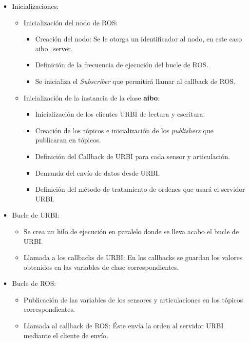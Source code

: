 \documentclass[12pt,a4paper,final,twoside]{book}
\begin{document}
\begin{itemize}
\item Inicializaciones: 
\begin{itemize}
\item Inicialización del nodo de ROS:
\begin{itemize}
\item Creación del nodo: Se le otorga un identificador al nodo, en este caso aibo{\_}server.
\item Definición de la frecuencia de ejecución del bucle de ROS.
\item Se inicializa el \textit{Subscriber} que permitirá llamar al callback de ROS.   
\end{itemize}

\item Inicialización de la instancia de la clase \textbf{aibo}:
\begin{itemize}
\item Inicialización de los clientes URBI de lectura y escritura.
\item Creación de los tópicos e inicialización de los \textit{publishers} que publicaran en tópicos.
\item Definición del Callback de URBI para cada sensor y articulación.
\item Demanda del envío de datos desde URBI.
\item Definición del método de tratamiento de ordenes que usará el servidor URBI.
\end{itemize}
\end{itemize}
\item Bucle de URBI:
\begin{itemize}
\item Se crea un hilo de ejecución en paralelo donde se lleva acabo el bucle de URBI.
\item Llamada a los callbacks de URBI: En los callbacks se guardan los valores obtenidos en las variables de clase correspondientes.

\end{itemize}
\item Bucle de ROS:
\begin{itemize}
\item Publicación de las variables de los sensores y articulaciones en los tópicos correspondientes.
\item Llamada al callback de ROS: Éste envía la orden al servidor URBI mediante el cliente de envío.
\end{itemize}
\end{itemize}
\end{document}
